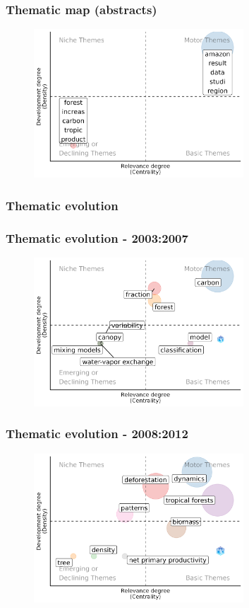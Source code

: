 \documentclass[aspectratio=169]{beamer}
\begin{document}
\begin{frame}
	\frametitle{Thematic map (abstracts)}
	\begin{figure}
		\centering
		\includegraphics[width=0.7\textwidth]
        {figures/thematic_map_abstracts.png}
	\end{figure}
\end{frame}


\subsubsection{Thematic evolution}


\begin{frame}
	\frametitle{Thematic evolution - 2003:2007}
    \begin{figure}
        \centering
        \includegraphics[width=0.7\textwidth]{figures/thematic_evolution_1.png}
    \end{figure}
\end{frame}

\begin{frame}
	\frametitle{Thematic evolution - 2008:2012}
    \begin{figure}
        \centering
        \includegraphics[width=0.7\textwidth]{figures/thematic_evolution_2.png}
    \end{figure}
\end{frame}
\end{document}
